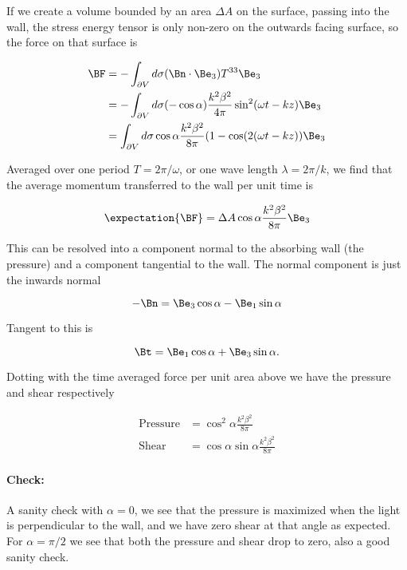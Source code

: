 If we create a volume bounded by an area $\Delta A$ on the surface, passing into the wall, the stress energy tensor is only non-zero on the outwards facing surface, so the force on that surface is

\begin{align*}
\BF 
&= - \int_{\partial V} d\sigma (\Bn \cdot \Be_3) T^{3 3} \Be_3 \\
&= - \int_{\partial V} d\sigma (-\cos\alpha) \frac{k^2 \beta^2}{4 \pi} \sin^2(\omega t - k z) \Be_3 \\
&= \int_{\partial V} d\sigma \cos\alpha \frac{k^2 \beta^2}{8 \pi} (1 - \cos(2( \omega t - k z)) \Be_3 \\
\end{align*}

Averaged over one period $T = 2 \pi/\omega$, or one wave length $\lambda = 2 \pi/k$, we find that the average momentum transferred to the wall per unit time is

\begin{equation}\label{eqn:relativisticElectrodynamicsPS6P1:n}
\expectation{\BF} = \Delta A \cos\alpha \frac{k^2 \beta^2}{8 \pi} \Be_3 
\end{equation}

This can be resolved into a component normal to the absorbing wall (the pressure) and a component tangential to the wall.  The normal component is just the inwards normal

\begin{equation}\label{eqn:relativisticElectrodynamicsPS6P1:n}
-\Bn = \Be_3 \cos \alpha - \Be_1 \sin\alpha 
\end{equation}

Tangent to this is

\begin{equation}\label{eqn:relativisticElectrodynamicsPS6P1:n}
\Bt = \Be_1 \cos\alpha + \Be_3 \sin\alpha.
\end{equation}

Dotting with the time averaged force per unit area above we have the pressure and shear respectively

\begin{align}\label{eqn:relativisticElectrodynamicsPS6P1:n}
\text{Pressure} &= \cos^2\alpha \frac{k^2 \beta^2}{8 \pi} \\
\text{Shear} &= \cos\alpha \sin\alpha \frac{k^2 \beta^2}{8 \pi} 
\end{align}

\paragraph{Check:}

A sanity check with $\alpha = 0$, we see that the pressure is maximized when the light is perpendicular to the wall, and we have zero shear at that angle as expected.  For $\alpha = \pi/2$ we see that both the pressure and shear drop to zero, also a good sanity check.
